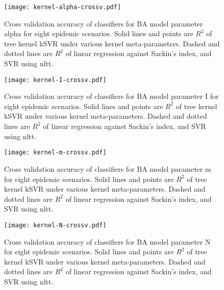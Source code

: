 \begin{figure}[ht]
  \centering
  \texttt{[image: kernel-alpha-crossv.pdf]}
  \caption[Cross validation accuracy of classifiers for \gls{BA} model parameter
    \gls{alpha} for eight epidemic scenarios.]
  {
    Cross validation accuracy of classifiers for \gls{BA} model parameter
    \gls{alpha} for eight epidemic scenarios. Solid lines and points are
    $R^2$ of tree kernel \gls{kSVR} under various kernel meta-parameters.
    Dashed and dotted lines are $R^2$ of linear regression against Sackin's
    index, and \gls{SVR} using \gls{nltt}.
  }
  \label{fig:alphacrossv}
\end{figure}

\begin{figure}[ht]
  \centering
  \texttt{[image: kernel-I-crossv.pdf]}
  \caption[Cross validation accuracy of classifiers for \gls{BA} model parameter
    \gls{I} for eight epidemic scenarios.]
  {
    Cross validation accuracy of classifiers for \gls{BA} model parameter
    \gls{I} for eight epidemic scenarios. Solid lines and points are $R^2$ of
    tree kernel \gls{kSVR} under various kernel meta-parameters. Dashed and
    dotted lines are $R^2$ of linear regression against Sackin's index, and
    \gls{SVR} using \gls{nltt}.
  }
  \label{fig:Icrossv}
\end{figure}

\begin{figure}[ht]
  \centering
  \texttt{[image: kernel-m-crossv.pdf]}
  \caption[Cross validation accuracy of classifiers for \gls{BA} model parameter
    \gls{m} for eight epidemic scenarios.]
  {
    Cross validation accuracy of classifiers for \gls{BA} model parameter
    \gls{m} for eight epidemic scenarios. Solid lines and points are $R^2$ of
    tree kernel \gls{kSVR} under various kernel meta-parameters. Dashed and
    dotted lines are $R^2$ of linear regression against Sackin's index, and
    \gls{SVR} using \gls{nltt}.
  }
  \label{fig:mcrossv}
\end{figure}

\begin{figure}[ht]
  \centering
  \texttt{[image: kernel-N-crossv.pdf]}
  \caption[Cross validation accuracy of classifiers for \gls{BA} model parameter
    \gls{N} for eight epidemic scenarios.]
  {
    Cross validation accuracy of classifiers for \gls{BA} model parameter
    \gls{N} for eight epidemic scenarios. Solid lines and points are $R^2$ of
    tree kernel \gls{kSVR} under various kernel meta-parameters. Dashed and
    dotted lines are $R^2$ of linear regression against Sackin's index, and
    \gls{SVR} using \gls{nltt}.
  }
  \label{fig:Ncrossv}
\end{figure}

